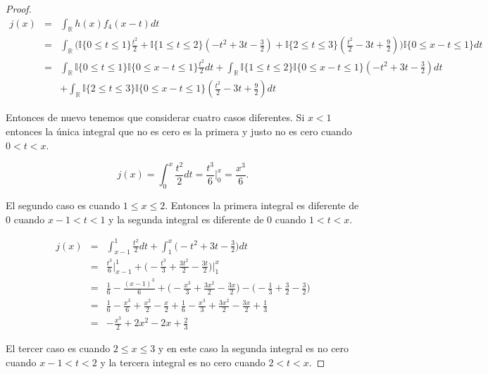 \documentclass[paper=letter, fontsize=11pt]{scrartcl} %
\numberwithin{equation}{section} %
\numberwithin{figure}{section} %
\numberwithin{table}{section} %
\begin{document}
\begin{enumerate}[label = \Alph*)]
\begin{enumerate}[label = \arabic*)]
\begin{proof}
\begin{eqnarray}
j(x) &=& \int_{\mathbb{R}} h(x)f_4(x-t)dt \nonumber
\\ &=& \int_{\mathbb{R}} \bigg(\mathbb{I}\{0\leq t \leq 1\}\frac{t^2}{2}+\mathbb{I}\{1\leq t \leq 2\}(-t^2+3t-\frac{3}{2})+\mathbb{I}\{2\leq t \leq 3\}(\frac{t^2}{2}-3t+\frac{9}{2})\bigg)\mathbb{I}\{0\leq x-t \leq 1\}dt \nonumber
\\&=& \int_{\mathbb{R}} \mathbb{I}\{0\leq t \leq 1\}\mathbb{I}\{0\leq x-t \leq 1\}\frac{t^2}{2}dt + \int_{\mathbb{R}} \mathbb{I}\{1\leq t \leq 2\}\mathbb{I}\{0\leq x-t \leq 1\}(-t^2+3t-\frac{3}{2})dt \nonumber
\\& & + \int_{\mathbb{R}} \mathbb{I}\{2\leq t \leq 3\}\mathbb{I}\{0\leq x-t \leq 1\}(\frac{t^2}{2}-3t+\frac{9}{2})dt  \nonumber 
\end{eqnarray}

Entonces de nuevo tenemos que considerar cuatro casos diferentes. Si $ x < 1 $ entonces la única integral que no es cero es la primera y justo no es cero cuando $ 0<t<x $.

 \begin{equation}
 j(x)=\int_{0}^x \frac{t^2}{2} dt = \frac{t^3}{6}\bigg|_0^x = \frac{x^3}{6}. \nonumber
 \end{equation}

El segundo caso es cuando $ 1 \leq x \leq  2 $. Entonces la primera integral es diferente de 0 cuando $ x-1 < t < 1 $ y la segunda integral es diferente de 0 cuando $ 1 < t < x $. 

\begin{eqnarray}
j(x)&=&\int_{x-1}^1 \frac{t^2}{2}dt + \int_1^x \bigg(-t^2+3t-\frac{3}{2}\bigg)dt \nonumber
\\ &=& \frac{t^3}{6}\bigg|_{x-1}^1+\bigg(-\frac{t^3}{3}+\frac{3t^2}{2}-\frac{3t}{2}\bigg)\bigg|_{1}^x\nonumber
\\&=& \frac{1}{6}-\frac{(x-1)^3}{6}+\bigg(-\frac{x^3}{3}+\frac{3x^2}{2}-\frac{3x}{2} \bigg) - \bigg( -\frac{1}{3}+\frac{3}{2}-\frac{3}{2} \bigg) \nonumber
\\&=& \frac{1}{6}-\frac{x^3}{6}+\frac{x^2}{2}-\frac{x}{2}+\frac{1}{6}-\frac{x^3}{3}+\frac{3x^2}{2}-\frac{3x}{2}+\frac{1}{3} \nonumber
\\&=& -\frac{x^3}{2}+2x^2-2x+\frac{2}{3} \nonumber
\end{eqnarray}

El tercer caso es cuando $ 2\leq x \leq 3 $ y en este caso la segunda integral es no cero cuando $ x-1<t<2 $ y la tercera integral es no cero cuando $ 2<t<x $.


\end{proof}
\end{enumerate}
\end{enumerate}
\end{document}
